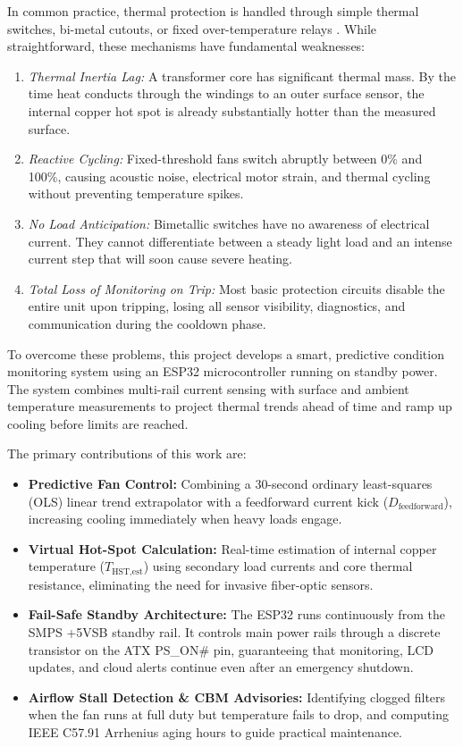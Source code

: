 \documentclass[conference]{IEEEtran}
\begin{document}
In common practice, thermal protection is handled through simple thermal switches, bi-metal cutouts, or fixed over-temperature relays \cite{b4}. While straightforward, these mechanisms have fundamental weaknesses:
\begin{enumerate}
    \item \textit{Thermal Inertia Lag:} A transformer core has significant thermal mass. By the time heat conducts through the windings to an outer surface sensor, the internal copper hot spot is already substantially hotter than the measured surface.
    \item \textit{Reactive Cycling:} Fixed-threshold fans switch abruptly between 0\% and 100\%, causing acoustic noise, electrical motor strain, and thermal cycling without preventing temperature spikes.
    \item \textit{No Load Anticipation:} Bimetallic switches have no awareness of electrical current. They cannot differentiate between a steady light load and an intense current step that will soon cause severe heating.
    \item \textit{Total Loss of Monitoring on Trip:} Most basic protection circuits disable the entire unit upon tripping, losing all sensor visibility, diagnostics, and communication during the cooldown phase.
\end{enumerate}

To overcome these problems, this project develops a smart, predictive condition monitoring system using an ESP32 microcontroller running on standby power. The system combines multi-rail current sensing with surface and ambient temperature measurements to project thermal trends ahead of time and ramp up cooling before limits are reached.

The primary contributions of this work are:
\begin{itemize}
    \item \textbf{Predictive Fan Control:} Combining a 30-second ordinary least-squares (OLS) linear trend extrapolator with a feedforward current kick ($D_{\text{feedforward}}$), increasing cooling immediately when heavy loads engage.
    \item \textbf{Virtual Hot-Spot Calculation:} Real-time estimation of internal copper temperature ($T_{\text{HST,est}}$) using secondary load currents and core thermal resistance, eliminating the need for invasive fiber-optic sensors.
    \item \textbf{Fail-Safe Standby Architecture:} The ESP32 runs continuously from the SMPS +5VSB standby rail. It controls main power rails through a discrete transistor on the ATX PS\_ON\# pin, guaranteeing that monitoring, LCD updates, and cloud alerts continue even after an emergency shutdown.
    \item \textbf{Airflow Stall Detection \& CBM Advisories:} Identifying clogged filters when the fan runs at full duty but temperature fails to drop, and computing IEEE C57.91 Arrhenius aging hours to guide practical maintenance.
\end{itemize}
\end{document}
